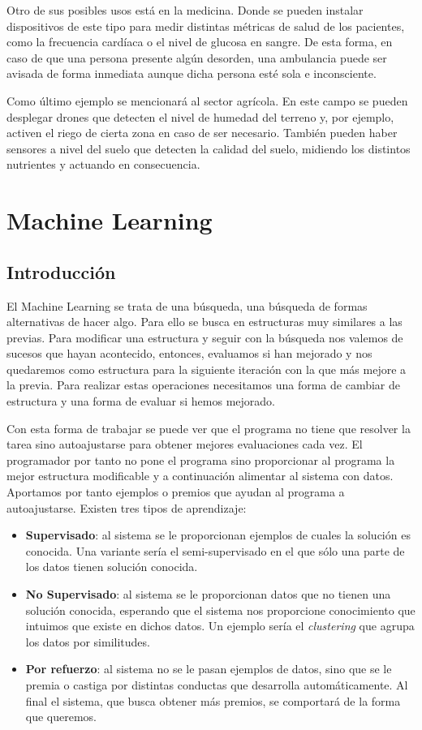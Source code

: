 Otro de sus posibles usos está en la medicina. Donde se pueden instalar dispositivos de este tipo para medir distintas métricas de salud de los pacientes, como la frecuencia cardíaca o el nivel de glucosa en sangre. De esta forma, en caso de que una persona presente algún desorden, una ambulancia puede ser avisada de forma inmediata aunque dicha persona esté sola e inconsciente.

Como último ejemplo se mencionará al sector agrícola. En este campo se pueden desplegar drones que detecten el nivel de humedad del terreno y, por ejemplo, activen el riego de cierta zona en caso de ser necesario. También pueden haber sensores a nivel del suelo que detecten la calidad del suelo, midiendo los distintos nutrientes y actuando en consecuencia.

\section{Machine Learning}

\subsection{Introducción}

El Machine Learning se trata de una búsqueda, una búsqueda de formas alternativas de hacer algo. Para ello se busca en estructuras muy similares a las previas. Para modificar una estructura y seguir con la búsqueda nos valemos de sucesos que hayan acontecido, entonces, evaluamos si han mejorado y nos quedaremos como estructura para la siguiente iteración con la que más mejore a la previa. Para realizar estas operaciones necesitamos una forma de cambiar de estructura y una forma de evaluar si hemos mejorado.

Con esta forma de trabajar se puede ver que el programa no tiene que resolver la tarea sino autoajustarse para obtener mejores evaluaciones cada vez. El programador por tanto no pone el programa sino proporcionar al programa la mejor estructura modificable y a continuación alimentar al sistema con datos. Aportamos por tanto ejemplos o premios que ayudan al programa a autoajustarse. Existen tres tipos de aprendizaje: 

\begin{itemize}
    \item \textbf{Supervisado}: al sistema se le proporcionan ejemplos de cuales la solución es conocida. Una variante sería el semi-supervisado en el que sólo una parte de los datos tienen solución conocida.
    \item \textbf{No Supervisado}: al sistema se le proporcionan datos que no tienen una solución conocida, esperando que el sistema nos proporcione conocimiento que intuimos que existe en dichos datos. Un ejemplo sería el \textit{clustering} que agrupa los datos por similitudes.
    \item \textbf{Por refuerzo}: al sistema no se le pasan ejemplos de datos, sino que se le premia o castiga por distintas conductas que desarrolla automáticamente. Al final el sistema, que busca obtener más premios, se comportará de la forma que queremos.
\end{itemize}

